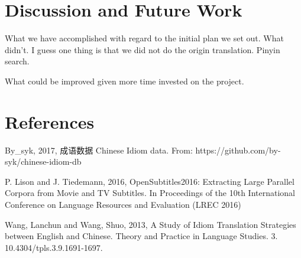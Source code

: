 \documentclass[11pt]{article} %
\begin{document}
\section{Discussion and Future Work}
\indent What we have accomplished with regard to the initial plan we set out. What didn't. I guess one thing is that we did not do the origin translation. Pinyin search.

\indent What could be improved given more time invested on the project. 



\section{References}

By\_syk, 2017, 成语数据 Chinese Idiom data. From: https://github.com/by-syk/chinese-idiom-db

P. Lison and J. Tiedemann, 2016, OpenSubtitles2016: Extracting Large Parallel Corpora from Movie and TV Subtitles. In Proceedings of the 10th International Conference on Language Resources and Evaluation (LREC 2016)

Wang, Lanchun and Wang, Shuo,  2013, A Study of Idiom Translation Strategies between English and Chinese. Theory and Practice in Language Studies. 3. 10.4304/tpls.3.9.1691-1697. 
\end{document}

